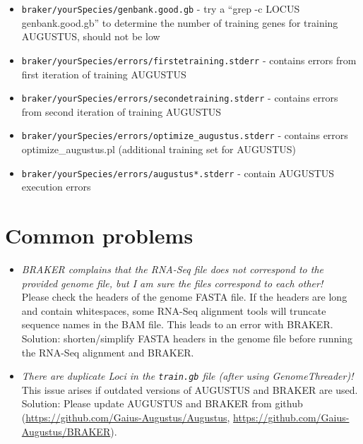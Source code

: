 \documentclass[a4paper,10pt]{report}
\begin{document}
\begin{itemize}
 \item  \texttt{braker/yourSpecies/genbank.good.gb} - try a ``grep -c LOCUS genbank.good.gb'' to determine the 
                                        number of training genes for training AUGUSTUS, should not
                                        be low

 \item  \texttt{braker/yourSpecies/errors/firstetraining.stderr} - contains errors from first iteration of 
                                                     training AUGUSTUS
 \item  \texttt{braker/yourSpecies/errors/secondetraining.stderr} - contains errors from second iteration of
                                                      training AUGUSTUS
   \item \texttt{braker/yourSpecies/errors/optimize\_augustus.stderr} - contains errors optimize\_augustus.pl 
                                                        (additional training set for AUGUSTUS)

 \item  \texttt{braker/yourSpecies/errors/augustus*.stderr} - contain AUGUSTUS execution errors

\end{itemize}

\section{Common problems}\label{commonproblems}

\begin{itemize}
	\item \textit{BRAKER complains that the RNA-Seq file does not correspond to the provided genome file, but I am sure the files correspond to each other!}\\
	Please check the headers of the genome FASTA file. If the headers are long and contain whitespaces, some RNA-Seq alignment tools will truncate sequence names in the BAM file. This leads to an error with BRAKER. Solution: shorten/simplify FASTA headers in the genome file before running the RNA-Seq alignment and BRAKER.
	\item \textit{There are duplicate Loci in the \texttt{train.gb} file (after using GenomeThreader)!}\\ This issue arises if outdated versions of AUGUSTUS and BRAKER are used. Solution: Please update AUGUSTUS and BRAKER from github (\url{https://github.com/Gaius-Augustus/Augustus}, \url{https://github.com/Gaius-Augustus/BRAKER}).
\end{itemize}
\end{document}
